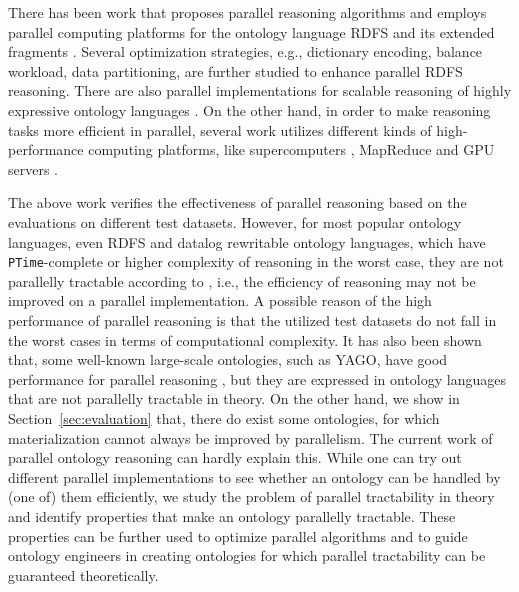\documentclass[final,1p,times]{elsarticle}
\begin{document}
There has been work that proposes parallel reasoning algorithms and employs parallel computing platforms
for the ontology language RDFS and its extended
fragments \cite{MotikNPHO14,PetersSZ15,SubercazeGCL16}. Several optimization strategies, e.g., dictionary encoding, balance workload,
data partitioning, are further studied to enhance parallel RDFS reasoning. There are also parallel implementations for scalable
reasoning of highly expressive ontology languages \cite{SteigmillerLG14,WuH12}. On the other hand, in order to make reasoning tasks more efficient
in parallel, several work utilizes different kinds of high-performance computing platforms, like supercomputers \cite{Hoeksema2011,GoodmanJMAAH11},
MapReduce \cite{UrbaniKMHB12} and GPU servers \cite{HeinoP12}.

The above work verifies the effectiveness of parallel reasoning based on the evaluations on different test datasets.
However, for most popular ontology languages, even RDFS and datalog rewritable ontology languages,
which have \texttt{PTime}-complete or higher complexity of reasoning in the worst case,
they are not parallelly tractable according to \cite{Raymond95}, i.e., the efficiency of reasoning may not be
improved on a parallel implementation. A possible reason of the high performance of parallel
reasoning is that the utilized test datasets do not fall in the worst cases in terms of computational complexity.
It has also been shown that, some well-known large-scale ontologies, such as YAGO, have good performance for parallel
reasoning \cite{KolovskiWE10}, but they are expressed in ontology languages that are not parallelly tractable in theory.
On the other hand, we show in Section~\ref{sec:evaluation} that, there do exist some ontologies, for which materialization cannot
always be improved by parallelism. The current work of parallel ontology reasoning can hardly explain this.
While one can try out different parallel implementations to see whether an ontology can be handled by (one of) them efficiently,
we study the problem of parallel tractability in theory and identify properties that make an ontology parallelly tractable.
These properties can be further used to optimize parallel algorithms and to guide ontology engineers in creating ontologies
for which parallel tractability can be guaranteed theoretically.
\end{document}
